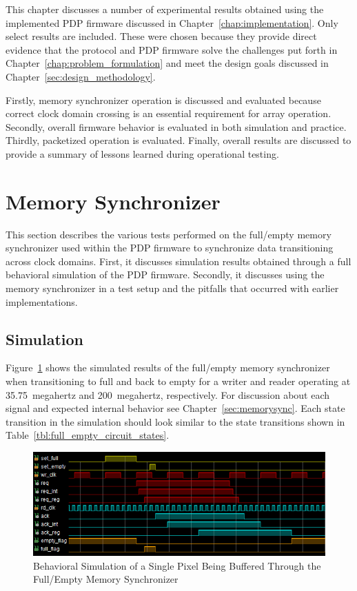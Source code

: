 
\label{chap:experimental_results}

This chapter discusses a number of experimental results obtained using the implemented PDP firmware discussed in Chapter~\ref{chap:implementation}. Only select results are included. These were chosen because they provide direct evidence that the protocol and PDP firmware solve the challenges put forth in Chapter~\ref{chap:problem_formulation} and meet the design goals discussed in Chapter~\ref{sec:design_methodology}.

 Firstly, memory synchronizer operation is discussed and evaluated because correct clock domain crossing is an essential requirement for array operation. Secondly, overall firmware behavior is evaluated in both simulation and practice. Thirdly, packetized operation is evaluated. Finally, overall results are discussed to provide a summary of lessons learned during operational testing.

\section{Memory Synchronizer}

    This section describes the various tests performed on the full/empty memory synchronizer used within the PDP firmware to synchronize data transitioning across clock domains. First, it discusses simulation results obtained through a full behavioral simulation of the PDP firmware. Secondly, it discusses using the memory synchronizer in a test setup and the pitfalls that occurred with earlier implementations.

    \subsection{Simulation}
        Figure~\ref{fig:full_empty_sim} shows the simulated results of the full/empty memory synchronizer when transitioning to full and back to empty for a writer and reader operating at \mbox{35.75 megahertz} and \mbox{200 megahertz}, respectively. For discussion about each signal and expected internal behavior see Chapter~\ref{sec:memorysync}. Each state transition in the simulation should look similar to the state transitions shown in Table~\ref{tbl:full_empty_circuit_states}.

        \begin{figure}[t]
            \centering
            \includegraphics[width=1.0\textwidth]{fig/full_empty_sim.png}
             \caption{Behavioral Simulation of a Single Pixel Being Buffered Through the Full/Empty Memory Synchronizer}
            \label{fig:full_empty_sim}
        \end{figure}

